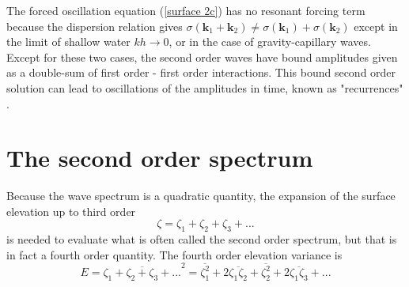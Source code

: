 The forced oscillation equation (\ref{surface 2c}) has no resonant forcing term because the dispersion relation 
gives
$\sigma\left({\mathbf k_1}+{\mathbf k_2}\right)
    \neq \sigma\left({\mathbf k_1}\right)+\sigma\left({\mathbf k_2}\right)$ except in the limit of shallow 
water  $kh \rightarrow 0$, or in the case of gravity-capillary waves. Except for these two cases, the second order waves have bound amplitudes given as a double-sum of first order - first order interactions. This bound 
second order solution can lead to oscillations of the amplitudes in time, known as "recurrences" \citep{Fermi&al.1955}.



\section{The second order spectrum}
Because the wave spectrum is a quadratic quantity, the expansion of the surface elevation up to third order 
\begin{equation}
 \zeta= \zeta_1 + \zeta_2 + \zeta_3 + ...
\end{equation}
is needed to evaluate what is often called the second order spectrum, but that is in fact a fourth order quantity. The fourth 
order elevation variance is 
\begin{equation}
 E= \overline{\zeta_1 + \zeta_2 + \zeta_3+ ...}^2  = \overline{\zeta_1^2} + 2 \overline{\zeta_1 \zeta_2} +\overline{\zeta_2^2} + 2 \overline{\zeta_1 \zeta_3} + ... 
\end{equation}


